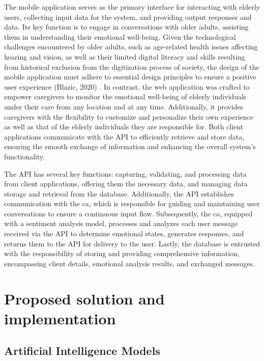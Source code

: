 \documentclass[a4paper,fleqn]{cas-sc}
\begin{document}
The mobile application serves as the primary interface for interacting with elderly users, collecting input data for the system, and providing output responses and data. Its key function is to engage in conversations with older adults, assisting them in understanding their emotional well-being. Given the technological challenges encountered by older adults, such as age-related health issues affecting hearing and vision, as well as their limited digital literacy and skills resulting from historical exclusion from the digitization process of society, the design of the mobile application must adhere to essential design principles to ensure a positive user experience (Blazic, 2020) \cite{blazic_overcoming_2020}. In contrast, the web application was crafted to empower caregivers to monitor the emotional well-being of elderly individuals under their care from any location and at any time. Additionally, it provides caregivers with the flexibility to customize and personalize their own experience as well as that of the elderly individuals they are responsible for. Both client applications communicate with the API to efficiently retrieve and store data, ensuring the smooth exchange of information and enhancing the overall system's functionality.

The API has several key functions: capturing, validating, and processing data from client applications, offering them the necessary data, and managing data storage and retrieval from the database. Additionally, the API establishes communication with the \gls{ca}, which is responsible for guiding and maintaining user conversations to ensure a continuous input flow. Subsequently, the \gls{ca}, equipped with a sentiment analysis model, processes and analyzes each user message received via the API to determine emotional states, generates responses, and returns them to the API for delivery to the user. Lastly, the database is entrusted with the responsibility of storing and providing comprehensive information, encompassing client details, emotional analysis results, and exchanged messages.
 
\section{Proposed solution and implementation}
\label{proposedSolution}



\subsection{Artificial Intelligence Models}
\end{document}
